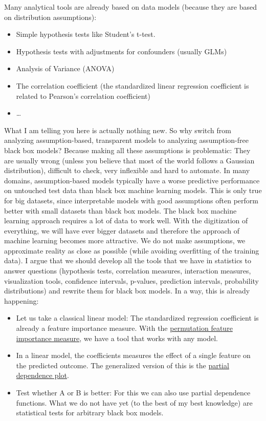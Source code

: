 \documentclass[12pt,]{krantz}
\providecommand{\tightlist}{%
  \setlength{\itemsep}{0pt}\setlength{\parskip}{0pt}}
\begin{document}
Many analytical tools are already based on data models (because they are
based on distribution assumptions):

\begin{itemize}
\tightlist
\item
  Simple hypothesis tests like Student's t-test.
\item
  Hypothesis tests with adjustments for confounders (usually GLMs)
\item
  Analysis of Variance (ANOVA)
\item
  The correlation coefficient (the standardized linear regression
  coefficient is related to Pearson's correlation coefficient)
\item
  \ldots{}
\end{itemize}

What I am telling you here is actually nothing new. So why switch from
analyzing assumption-based, transparent models to analyzing
assumption-free black box models? Because making all these assumptions
is problematic: They are usually wrong (unless you believe that most of
the world follows a Gaussian distribution), difficult to check, very
inflexible and hard to automate. In many domains, assumption-based
models typically have a worse predictive performance on untouched test
data than black box machine learning models. This is only true for big
datasets, since interpretable models with good assumptions often perform
better with small datasets than black box models. The black box machine
learning approach requires a lot of data to work well. With the
digitization of everything, we will have ever bigger datasets and
therefore the approach of machine learning becomes more attractive. We
do not make assumptions, we approximate reality as close as possible
(while avoiding overfitting of the training data). I argue that we
should develop all the tools that we have in statistics to answer
questions (hypothesis tests, correlation measures, interaction measures,
visualization tools, confidence intervals, p-values, prediction
intervals, probability distributions) and rewrite them for black box
models. In a way, this is already happening:

\begin{itemize}
\tightlist
\item
  Let us take a classical linear model: The standardized regression
  coefficient is already a feature importance measure. With the
  \protect\hyperlink{feature-importance}{permutation feature importance
  measure}, we have a tool that works with any model.
\item
  In a linear model, the coefficients measures the effect of a single
  feature on the predicted outcome. The generalized version of this is
  the \protect\hyperlink{pdp}{partial dependence plot}.
\item
  Test whether A or B is better: For this we can also use partial
  dependence functions. What we do not have yet (to the best of my best
  knowledge) are statistical tests for arbitrary black box models.
\end{itemize}
\end{document}
